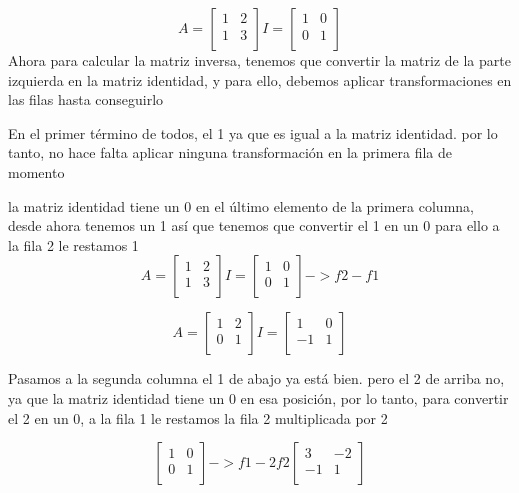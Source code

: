 \documentclass{article}
\begin{document}
\[
A =
\begin{bmatrix}
 1 & 2  \\
 1 & 3  \\
\end{bmatrix}
I =
\begin{bmatrix}
 1 & 0  \\
 0 & 1  \\
\end{bmatrix}
\]
Ahora para calcular la matriz inversa, tenemos que convertir la matriz de la parte izquierda
en la matriz identidad, y para ello, debemos aplicar transformaciones en las filas hasta conseguirlo

En el primer término de todos, el 1 ya que es igual a la matriz identidad. por lo tanto, no hace falta aplicar 
ninguna transformación en la primera fila de momento

la matriz identidad tiene un 0 en el último elemento de la primera columna, desde ahora tenemos un 1
así que tenemos que convertir el 1 en un 0 para ello a la fila 2 le restamos 1
\[
A =
\begin{bmatrix}
 1 & 2  \\
 1 & 3  \\
\end{bmatrix}
I =
\begin{bmatrix}
 1 & 0  \\
 0 & 1  \\
\end{bmatrix}
-> f2-f1
\]

\[
A =
\begin{bmatrix}
 1 & 2  \\
 0 & 1  \\
\end{bmatrix}
I =
\begin{bmatrix}
 1 & 0  \\
 -1 & 1  \\
\end{bmatrix}
\]

Pasamos a la segunda columna el 1 de abajo ya está bien.
pero el 2 de arriba no, ya que la matriz identidad tiene un 0 en esa posición,
por lo tanto, para convertir el 2 en un 0, a la fila 1 le restamos la fila 2 multiplicada por 2

\[
\begin{bmatrix}
 1 & 0  \\
 0 & 1  \\
\end{bmatrix}
-> f1-2f2
\begin{bmatrix}
 3 & -2  \\
 -1 & 1  \\
\end{bmatrix}
\]
\end{document}
